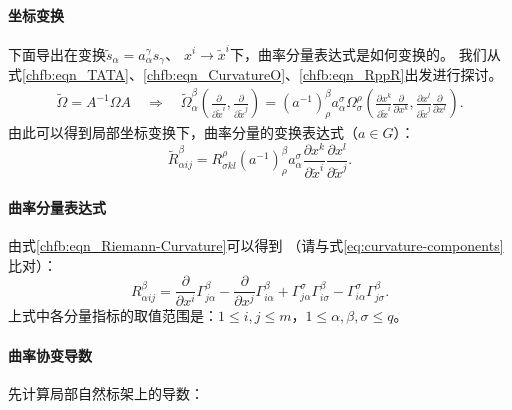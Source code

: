\paragraph{坐标变换} 下面导出在变换$\tilde{s}_\alpha=a_{\alpha}^\gamma s_\gamma$、
$x^i\to \tilde{x}^i$下，曲率分量表达式是如何变换的。
我们从式\eqref{chfb:eqn_TATA}、\eqref{chfb:eqn_CurvatureO}、\eqref{chfb:eqn_RppR}出发进行探讨。
\begin{align*}
	\widetilde{\Omega} =A^{-1} \Omega A \quad \Rightarrow \quad
	\widetilde{\Omega}_{\alpha}^\beta
	\left( \frac{\partial }{\partial \tilde{x}^i}, \frac{\partial }{\partial \tilde{x}^j} \right)
	=\left(a^{-1}\right)_{\rho}^\beta a_{\alpha}^\sigma
	\Omega_{\sigma}^\rho
	\left( \frac{\partial x^k }{\partial \tilde{x}^i} \frac{\partial }{\partial x^k},
	\frac{\partial x^l }{\partial \tilde{x}^j} \frac{\partial }{\partial x^l} \right) .
\end{align*}
由此可以得到局部坐标变换下，曲率分量的变换表达式（$a\in G$）：
\begin{equation}
	\widetilde{R}^\beta_{\alpha ij}
	= R^\rho_{\sigma kl}
	\left(a^{-1}\right)_{\rho}^\beta a_{\alpha}^\sigma
	\frac{\partial x^k }{\partial \tilde{x}^i} \frac{\partial x^l }{\partial \tilde{x}^j} .
\end{equation}

\paragraph{曲率分量表达式} 由式\eqref{chfb:eqn_Riemann-Curvature}可以得到
（请与式\eqref{eq:curvature-components}比对）：
\begin{equation}\label{chfb:eqn_R-vector-bundle}
	R_{\alpha i j}^\beta
	= \frac{\partial}{\partial x^i} \Gamma^{\beta}_{j \alpha}
	-\frac{\partial}{\partial x^j} \Gamma^{\beta}_{i \alpha}
	+\Gamma^{\sigma}_{j \alpha} \Gamma^{\beta}_{i \sigma}
	-  \Gamma^{\sigma}_{i \alpha}\Gamma^{\beta}_{j \sigma} .
\end{equation}
上式中各分量指标的取值范围是：$ 1\leqslant i,j \leqslant m $，$ 1\leqslant \alpha,\beta,\sigma \leqslant q$。

\paragraph{曲率协变导数} 先计算局部自然标架上的导数：

